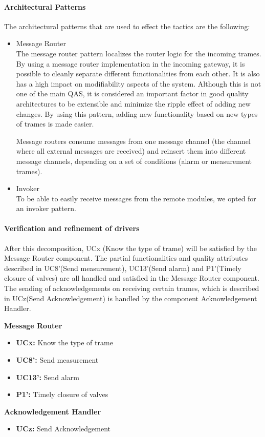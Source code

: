\paragraph{Architectural Patterns}
The architectural patterns that are used to effect the tactics are the following:
\begin{itemize}
	\item Message Router\\
	The message router pattern localizes the router logic for the incoming trames.
	By using a message router implementation in the incoming gateway, it is possible to 
	cleanly separate different functionalities from each other.
	It is also has a high impact on modifiability aspects of the system. Although this is not one of the main QAS, it is considered an important factor in good quality architectures to be extensible and minimize the ripple effect of adding new changes. By using this pattern, adding new functionality based on new types of trames is made easier.  
	
	Message routers consume messages from one message channel (the channel where all
		external messages are received) and reinsert them into different message
		channels, depending on a set of conditions (alarm or measurement trames).
	\item Invoker \\
	To be able to easily receive messages from the remote modules, we opted
		for an invoker pattern.
\end{itemize}


\paragraph{Verification and refinement of drivers}
After this decomposition, UCx (Know the type of trame) will be satisfied by the Message Router component. 
The partial functionalities and quality attributes described in UC8'(Send measurement), UC13'(Send alarm) and P1'(Timely closure of valves) are all handled and satisfied in the Message Router component.
The sending of acknowledgements on receiving certain trames, which is described in UCz(Send Acknowledgement) is handled by the component Acknowledgement Handler.

\textbf{Message Router}
\begin{itemize}
	\item \textbf{UCx: } Know the type of trame
	\item \textbf{UC8': } Send measurement 
	\item \textbf{UC13': } Send alarm 
	\item \textbf{P1': } Timely closure of valves
\end{itemize}

\textbf{Acknowledgement Handler}
\begin{itemize}
	\item \textbf{UCz: } Send Acknowledgement
\end{itemize}


